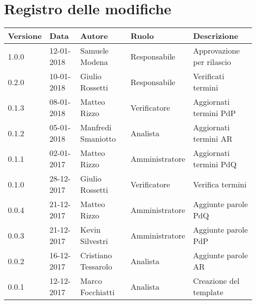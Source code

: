 \documentclass[./AnalisideiRequisiti.tex]{subfiles}
\begin{document}
	
{
	\chapter*{Registro delle modifiche}
\setlength\LTleft{-22mm}
	\begin{longtable}{|p{20mm}|p{20mm}|p{40mm}|p{30mm}|p{50mm}|}
		\hline
		\textbf{Versione} & \textbf{Data} & \textbf{Autore} & \textbf{Ruolo} & \textbf{Descrizione} \\ \hline 
		1.0.0 & 12-01-2018 & Samuele Modena & Responsabile & Approvazione per rilascio\\ \hline
		0.2.0 & 10-01-2018 & Giulio Rossetti & Responsabile & Verificati termini\\ \hline
	
		0.1.3 & 08-01-2018 & Matteo Rizzo & Verificatore & Aggiornati termini PdP\\ \hline
		0.1.2 & 05-01-2018 & Manfredi Smaniotto & Analista & Aggiornati termini AR \\ \hline		
		0.1.1 & 02-01-2017 & Matteo Rizzo & Amministratore & Aggiornati termini PdQ\\ \hline	
	   	0.1.0 & 28-12-2017 & Giulio Rossetti & Verificatore & Verifica termini\\ \hline		
		0.0.4 & 21-12-2017 & Matteo Rizzo & Amministratore & Aggiunte parole PdQ \\ \hline
		0.0.3 & 21-12-2017 & Kevin Silvestri & Amministratore & Aggiunte parole PdP \\ \hline
		0.0.2 & 16-12-2017 & Cristiano Tessarolo & Analista & Aggiunte parole AR\\ \hline
		0.0.1 & 12-12-2017 & Marco Focchiatti & Analista & Creazione del template\\ \hline
	\end{longtable}

}	
\end{document}
